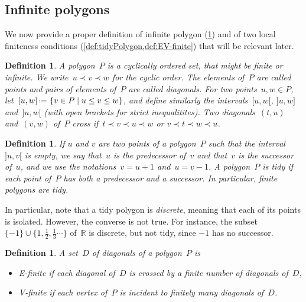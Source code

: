 \documentclass{amsart}
\newtheorem{definition}[theorem]{Definition}
\theoremstyle{remark}
\newcommand{\darkblue}{\color{darkblue}} %
\newcommand{\defn}[1]{\textsl{\darkblue #1}} %
\newcommand{\R}{\mathbb{R}} %
\newcommand{\set}[2]{\left\{ #1 \;\middle|\; #2 \right\}} %
\newcommand{\eqdef}{\mbox{\,\raisebox{0.2ex}{\scriptsize\ensuremath{\mathrm:}}\ensuremath{=}\,}} %
\newcommand*{\ef}[0]{E-finite\xspace}
\newcommand*{\vf}[0]{V-finite\xspace}
\newcommand{\cl}{\prec}
\begin{document}

\subsection{Infinite polygons}

We now provide a proper definition of infinite polygon (\cref{def:infinitePolygon}) and of two local finiteness conditions (\cref{def:tidyPolygon,def:EV-finite}) that will be relevant later.

\begin{definition}
\label{def:infinitePolygon}
A \defn{polygon}~$P$ is a cyclically ordered set, that might be finite or infinite.
We write~$u \cl v \cl w$ for the cyclic order.
The elements of~$P$ are called \defn{points} and pairs of elements of~$P$ are called \defn{diagonals}.
For two points~$u,w \in P$, let~$[u,w] \eqdef \set{v \in P}{u \le v \le w}$, and define similarly the intervals~$[u,w[$, $]u,w]$ and~$]u,w[$ (with open brackets for strict inequalitites).
Two diagonals~$(t,u)$ and~$(v,w)$ of~$P$ \defn{cross} if~$t \cl v \cl u \cl w$ or $v \cl t \cl w \cl u$.
\end{definition}

\begin{definition}
\label{def:tidyPolygon}
If $u$ and $v$ are two points of a polygon~$P$ such that the interval~$]u,v[$ is empty, we say that~$u$ is the \defn{predecessor} of~$v$ and that~$v$ is the \defn{successor} of~$u$, and we use the notations~$v = u+1$ and~$u = v-1$. A polygon~$P$ is \defn{tidy} if each point of~$P$ has both a predecessor and a successor. In particular, finite polygons are tidy.
\end{definition}

In particular, note that a tidy polygon is \defn{discrete}, meaning that each of its points is isolated. However, the converse is not true. For instance, the subset $\{-1\}\cup \{1, \frac{1}{2},\frac{1}{3}\cdots\}$ of~$\R$ is discrete, but not tidy, since $-1$ has no successor.

\begin{definition}
\label{def:EV-finite}
A set~$D$ of diagonals of a polygon~$P$ is 
\begin{itemize}
\item \defn{\ef} if each diagonal of~$D$ is crossed by a finite number of diagonals of~$D$,
\item \defn{\vf} if each vertex of~$P$ is incident to finitely many diagonals of~$D$.
\end{itemize}
\end{definition}
\end{document}
